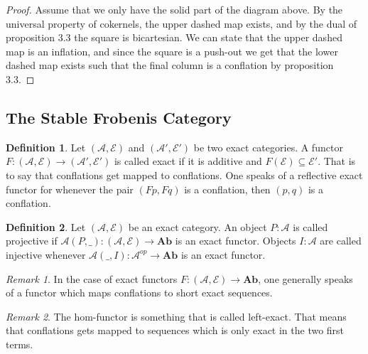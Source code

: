 \documentclass[12pt]{article}
\theoremstyle{definition}
\newtheorem{definition}{Definition}[section]
\theoremstyle{remark}
\newtheorem*{remark}{Remark}
\begin{document}
            \begin{proof}
                Assume that we only have the solid part of the diagram above. By the universal property of cokernels, the upper dashed map exists, and by the dual of proposition 3.3 the square is bicartesian. We can state that the upper dashed map is an inflation, and since the square is a push-out we get that the lower dashed map exists such that the final column is a conflation by proposition 3.3.
            \end{proof}

        \subsection{The Stable Frobenis Category}

            \begin{definition}
                Let $(\mathcal{A},\mathcal{E})$ and $(\mathcal{A}',\mathcal{E}')$ be two exact categories. A functor $F:(\mathcal{A},\mathcal{E})\rightarrow (\mathcal{A}',\mathcal{E}')$ is called exact if it is additive and $F(\mathcal{E})\subseteq \mathcal{E}'$. That is to say that conflations get mapped to conflations. One speaks of a reflective exact functor for whenever the pair $(Fp,Fq)$ is a conflation, then $(p,q)$ is a conflation.
            \end{definition}

            \begin{definition}
                Let $(\mathcal{A},\mathcal{E})$ be an exact category. An object $P:\mathcal{A}$ is called projective if $\mathcal{A}(P,\_):(\mathcal{A},\mathcal{E})\rightarrow \textbf{Ab}$ is an exact functor. Objects $I:\mathcal{A}$ are called injective whenever $\mathcal{A}(\_,I):\mathcal{A}^{op}\rightarrow\textbf{Ab}$ is an exact functor.
            \end{definition}

            \begin{remark}
                In the case of exact functors $F:(\mathcal{A},\mathcal{E})\rightarrow\textbf{Ab}$, one generally speaks of a functor which maps conflations to short exact sequences.
            \end{remark}

            \begin{remark}
                The hom-functor is something that is called left-exact. That means that conflations gets mapped to sequences which is only exact in the two first terms.
            \end{remark}
\end{document}
